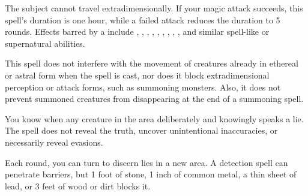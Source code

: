 \spellrng{\rngmed}
\begin{spelleffect}
    The subject cannot travel extradimensionally. If your magic attack succeeds, this spell's duration is one hour, while a failed attack reduces the duration to 5 rounds. Effects barred by a  include , , , , , , , , , and similar spell-like or supernatural abilities.
\end{spelleffect}
\begin{spellnotes}
    This spell does not interfere with the movement of creatures already in ethereal or astral form when the spell is cast, nor does it block extradimensional perception or attack forms, such as summoning monsters. Also, it does not prevent summoned creatures from disappearing at the end of a summoning spell.
\end{spellnotes}

\begin{spelleffect}
  You know when any creature in the area deliberately and knowingly speaks a lie. The spell does not reveal the truth, uncover unintentional inaccuracies, or necessarily reveal evasions.
\end{spelleffect}
\begin{spellnotes}
  Each round, you can turn to discern lies in a new area. A detection spell can penetrate barriers, but 1 foot of stone, 1 inch of common metal, a thin sheet of lead, or 3 feet of wood or dirt blocks it.
\end{spellnotes}

